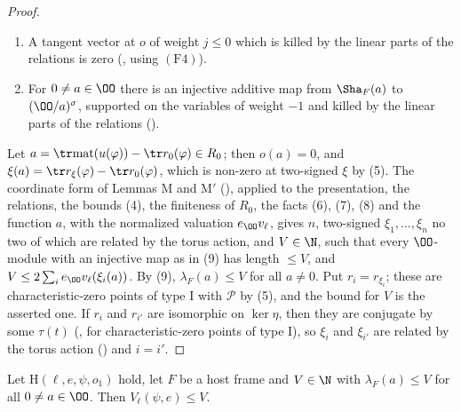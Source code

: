 \begin{proof}
\begin{enumerate}[label=(\arabic*)]
  (, from the rigidity of $r_\xi$).
\item A tangent vector at $o$ of weight $j\le0$ which is killed by the linear parts of the relations is zero
  (, using $(\mathrm{F4})$).
\item For $0\ne a\in\OO$ there is an injective additive map from $\Sha_F(a)$ to $(\OO/a)^\sigma$, supported on the variables of weight
  $-1$ and killed by the linear parts of the relations ().
\end{enumerate}
Let $a=\tr\mathrm{mat}(u(\varphi))-\tr\eisrz(\varphi)\in R_0$; then $o(a)=0$, and $\xi(a)=\tr r_\xi(\varphi)-\tr\eisrz(\varphi)$, which is non-zero at
two-signed $\xi$ by (5). The coordinate form of Lemmas M and M$'$ (), applied
to the presentation, the relations, the bounds (4), the finiteness of $R_0$, the facts (6), (7), (8) and the function $a$, with the normalized
valuation $e_\OO\eisv$, gives $n$, two-signed $\xi_1,\dots,\xi_n$ no two of which are related by the torus action, and $V\in\N$, such that every
$\OO$-module with an injective map as in (9) has length $\le V$, and $V\le2\sum_ie_\OO\eisv(\xi_i(a))$. By (9), $\lambda_F(a)\le V$ for all
$a\ne0$. Put $r_i=r_{\xi_i}$; these are characteristic-zero points of type I with $\mathcal P$ by (5), and the bound for $V$ is the asserted one.
If $r_i$ and $r_{i'}$ are isomorphic on $\ker\eta$, then they are conjugate by some $\tau(t)$
(, for characteristic-zero points of type I), so $\xi_i$ and $\xi_{i'}$ are related by
the torus action () and $i=i'$.
\end{proof}

\begin{lemma}\label{pf:eis:vlenV}
Let $\mathrm{H}(\ell,e,\psi,o_1)$ hold, let $F$ be a host frame and $V\in\N$ with $\lambda_F(a)\le V$ for all $0\ne a\in\OO$. Then
$V_\ell(\psi,e)\le V$.
\end{lemma}

